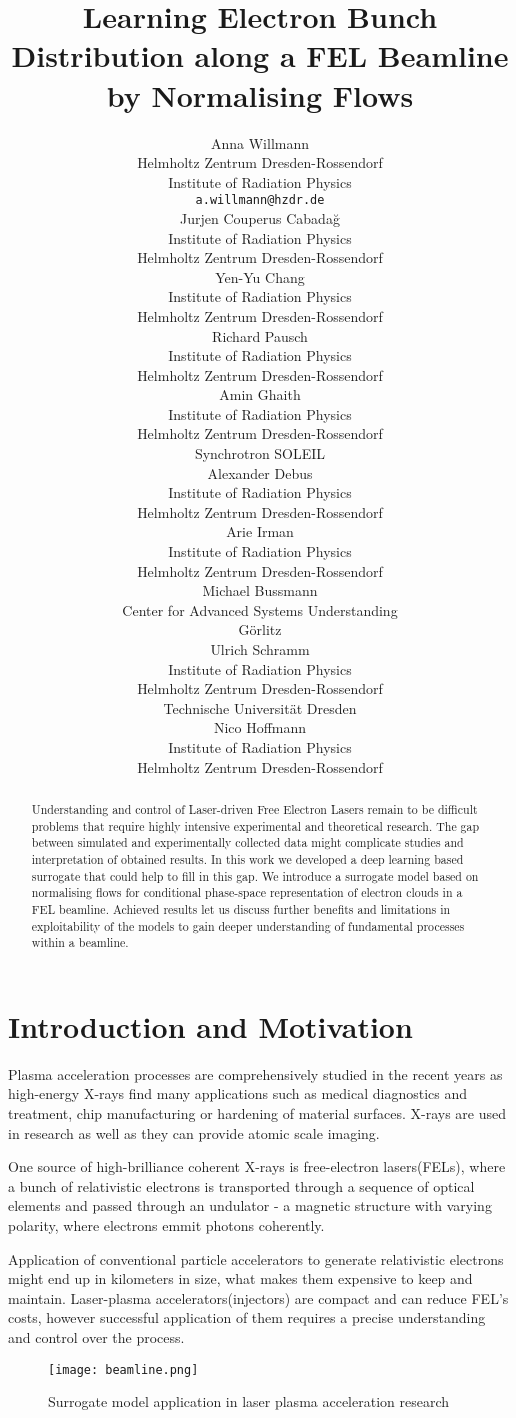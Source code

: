 \documentclass{article}
\title{Learning Electron Bunch Distribution along a FEL Beamline by Normalising Flows}
\author{%
Anna Willmann \\
Helmholtz Zentrum Dresden-Rossendorf \\
Institute of Radiation Physics\\
\texttt{a.willmann@hzdr.de} \\
\And
    Jurjen Couperus Cabadağ \\
    Institute of Radiation Physics\\
    Helmholtz Zentrum Dresden-Rossendorf \\
\And
    Yen-Yu Chang \\
    Institute of Radiation Physics\\
Helmholtz Zentrum Dresden-Rossendorf \\
\And
    Richard Pausch \\
    Institute of Radiation Physics\\
Helmholtz Zentrum Dresden-Rossendorf \\
\And
    Amin Ghaith \\
    Institute of Radiation Physics\\
Helmholtz Zentrum Dresden-Rossendorf \\
Synchrotron SOLEIL \\
\And
    Alexander Debus \\
    Institute of Radiation Physics\\
Helmholtz Zentrum Dresden-Rossendorf \\
\And
    Arie Irman \\
    Institute of Radiation Physics\\
Helmholtz Zentrum Dresden-Rossendorf \\
\And
    Michael Bussmann\\
    Center for Advanced Systems Understanding\\
    Görlitz\\
\And
    Ulrich Schramm \\
    Institute of Radiation Physics\\
Helmholtz Zentrum Dresden-Rossendorf \\
Technische Universität Dresden\\
\And
    Nico Hoffmann \\
    Institute of Radiation Physics\\
Helmholtz Zentrum Dresden-Rossendorf \\}
\begin{document}
\maketitle

\begin{abstract}
    Understanding and control of Laser-driven Free Electron Lasers remain to be difficult problems that require highly intensive experimental and theoretical research. 
    The gap between simulated and experimentally collected data might complicate studies and interpretation of obtained results. 
    In this work we developed a deep learning based surrogate that could help to fill in this gap.
    We introduce a surrogate model based on normalising flows for conditional phase-space representation of electron clouds in a FEL beamline. Achieved results let us discuss further benefits and limitations in exploitability of the models to gain deeper understanding of fundamental processes within a beamline.
\end{abstract}

\section{Introduction and Motivation}
Plasma acceleration processes are comprehensively studied in the recent years as high-energy X-rays find many applications such as medical diagnostics and treatment, chip manufacturing or hardening of material surfaces. X-rays are used in research as well as they can provide atomic scale imaging.

One source of high-brilliance coherent X-rays is free-electron lasers(FELs), where a bunch of relativistic electrons is transported through a sequence of optical elements and passed through an undulator - a magnetic structure with varying polarity, where electrons emmit photons coherently.

Application of conventional particle accelerators to generate relativistic electrons might end up in kilometers in size, what makes them expensive to keep and maintain. 
Laser-plasma accelerators(injectors) are compact and can reduce FEL's costs, however successful application of them requires a precise understanding and control over the process.

\begin{figure}[h!]
  \centering
  \texttt{[image: beamline.png]}
  \caption{Surrogate model application in laser plasma acceleration research}
  \label{fig:beamline}
\end{figure}
\end{document}

